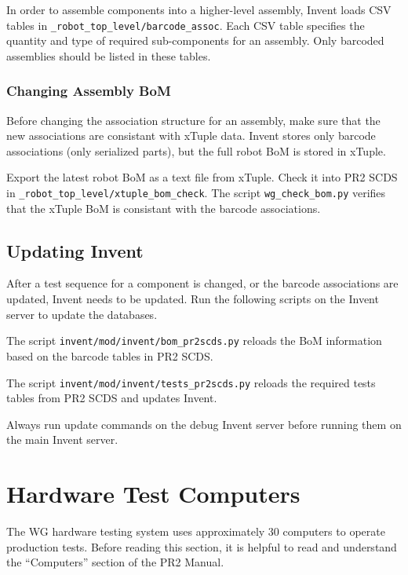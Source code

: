 \documentclass[11pt]{report}
\begin{document}
In order to assemble components into a higher-level assembly, Invent loads CSV tables in \texttt{\_robot\_top\_level/barcode\_assoc}. Each CSV table specifies the quantity and type of required sub-components for an assembly. Only barcoded assemblies should be listed in these tables.


\subsection{Changing Assembly BoM}

Before changing the association structure for an assembly, make sure that the new associations are consistant with xTuple data. Invent stores only barcode associations (only serialized parts), but the full robot BoM is stored in xTuple.

Export the latest robot BoM as a text file from xTuple. Check it into PR2 SCDS in \texttt{\_robot\_top\_level/xtuple\_bom\_check}. The script \texttt{wg\_check\_bom.py} verifies that the xTuple BoM is consistant with the barcode associations.

\section{Updating Invent}

After a test sequence for a component is changed, or the barcode associations are updated, Invent needs to be updated. Run the following scripts on the Invent server to update the databases.

The script \texttt{invent/mod/invent/bom\_pr2scds.py} reloads the BoM information based on the barcode tables in PR2 SCDS. 

The script \texttt{invent/mod/invent/tests\_pr2scds.py} reloads the required tests tables from PR2 SCDS and updates Invent.

Always run update commands on the debug Invent server before running them on the main Invent server.





\chapter{Hardware Test Computers}

The WG hardware testing system uses approximately 30 computers to operate production tests. Before reading this section, it is helpful to read and understand the ``Computers'' section of the PR2 Manual.
\end{document}
